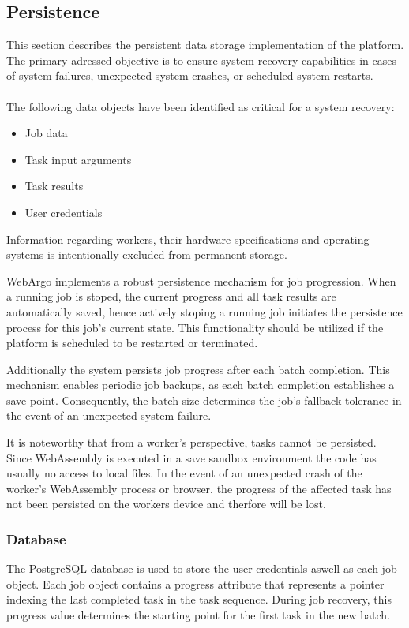 \subsection{Persistence}
\label{subsec:implementation:architecture:persistence}
This section describes the persistent data storage implementation of the platform. The primary adressed objective is to ensure system recovery capabilities in cases of system failures, unexpected system crashes, or scheduled system restarts.
\\~\\
The following data objects have been identified as critical for a system recovery:
\begin{itemize}
    \item Job data
    \item Task input arguments
    \item Task results
    \item User credentials
\end{itemize}
Information regarding workers, their hardware specifications and operating systems is intentionally excluded from permanent storage.

WebArgo implements a robust persistence mechanism for job progression. When a running job is stoped, the current progress and all task results are automatically saved, hence actively stoping a running job initiates the persistence process for this job's current state. This functionality should be utilized if the platform is scheduled to be restarted or terminated.

Additionally the system persists job progress after each batch completion. This mechanism enables periodic job backups, as each batch completion establishes a save point. Consequently, the batch size determines the job's fallback tolerance in the event of an unexpected system failure.

It is noteworthy that from a worker's perspective, tasks cannot be persisted. Since WebAssembly is executed in a save sandbox environment the code has usually no access to local files. In the event of an unexpected crash of the worker's WebAssembly process or browser, the progress of the affected task has not been persisted on the workers device and therfore will be lost.

\subsubsection{Database}
The PostgreSQL database is used to store the user credentials aswell as each job object. Each job object contains a progress attribute that represents a pointer indexing the last completed task in the task sequence. During job recovery, this progress value determines the starting point for the first task in the new batch.

